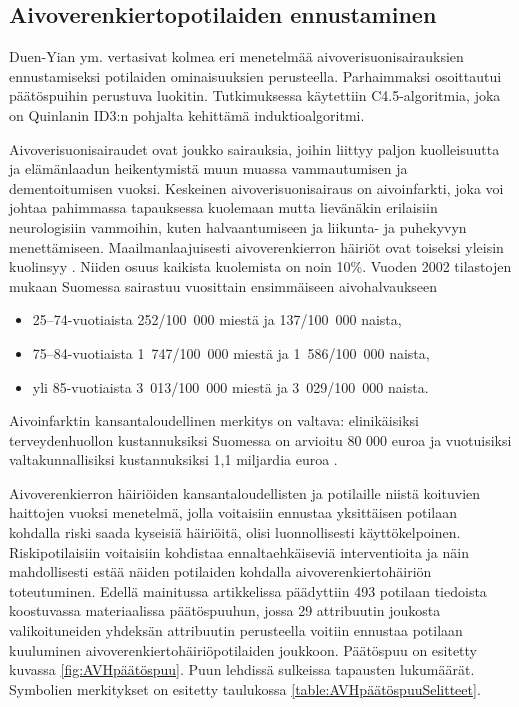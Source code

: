 \documentclass[12pt,finnish]{tktltiki2}
\theoremstyle{definition}
\theoremstyle{remark}
\begin{document}
\subsection{Aivoverenkiertopotilaiden ennustaminen}
Duen-Yian ym. \cite{predictiveModelCerebrovascularDisease} vertasivat kolmea eri menetelmää aivoverisuonisairauksien ennustamiseksi potilaiden ominaisuuksien
perusteella. Parhaimmaksi osoittautui päätöspuihin perustuva
luokitin. Tutkimuksessa käytettiin C4.5-algoritmia, joka on Quinlanin ID3:n pohjalta kehittämä induktioalgoritmi.

Aivoverisuonisairaudet ovat joukko sairauksia, joihin liittyy paljon kuolleisuutta ja elämänlaadun heikentymistä
muun muassa vammautumisen ja dementoitumisen vuoksi. Keskeinen aivoverisuonisairaus on aivoinfarkti, joka
voi johtaa pahimmassa tapauksessa kuolemaan mutta lievänäkin erilaisiin neurologisiin vammoihin, kuten
halvaantumiseen ja liikunta- ja puhekyvyn menettämiseen. Maailmanlaajuisesti aivoverenkierron häiriöt ovat toiseksi yleisin
kuolinsyy \cite{burdenOfDisease}. Niiden osuus kaikista kuolemista on noin 10\%. Vuoden 2002 tilastojen mukaan
\cite{aivohalvaustenIlmaantuvuusSuomessa19912002} Suomessa sairastuu vuosittain ensimmäiseen aivohalvaukseen
\begin{itemize}
  \item 25–74-vuotiaista 252/100~000 miestä ja 137/100~000 naista,
  \item 75–84-vuotiaista 1~747/100~000 miestä ja 1~586/100~000 naista,
  \item yli 85-vuotiaista 3~013/100~000 miestä ja 3~029/100~000 naista.
\end{itemize}
Aivoinfarktin kansantaloudellinen merkitys on valtava: elinikäisiksi terveydenhuollon kustannuksiksi
Suomessa on arvioitu 80 000 euroa ja vuotuisiksi valtakunnallisiksi kustannuksiksi 1,1 miljardia euroa
\cite{aivoinfarktinKustannuksetTHL}.

Aivoverenkierron häiriöiden kansantaloudellisten ja potilaille niistä koituvien haittojen vuoksi
menetelmä, jolla voitaisiin ennustaa yksittäisen potilaan kohdalla riski saada kyseisiä häiriöitä,
olisi luonnollisesti käyttökelpoinen. Riskipotilaisiin voitaisiin kohdistaa ennaltaehkäiseviä
interventioita ja näin mahdollisesti estää näiden potilaiden kohdalla aivoverenkiertohäiriön
toteutuminen. Edellä mainitussa artikkelissa \cite{predictiveModelCerebrovascularDisease}
päädyttiin 493 potilaan tiedoista koostuvassa materiaalissa päätöspuuhun, jossa 29 attribuutin joukosta
valikoituneiden yhdeksän attribuutin perusteella voitiin ennustaa potilaan kuuluminen
aivoverenkiertohäiriöpotilaiden joukkoon. Päätöspuu on esitetty kuvassa \ref{fig:AVHpäätöspuu}.
Puun lehdissä sulkeissa tapausten lukumäärät. Symbolien merkitykset on esitetty taulukossa 
\ref{table:AVHpäätöspuuSelitteet}.
\end{document}

